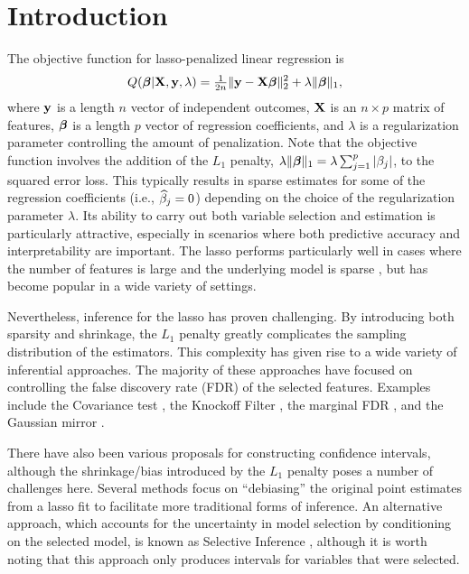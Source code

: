 \section{Introduction}

The objective function for lasso-penalized linear regression \citep{Tibshirani1996} is
$$Q(\boldsymbol{\beta}|\mathbf{X},\mathbf{y},\lambda) = \tfrac{1}{2n}\lVert\mathbf{y} - \mathbf{X}\boldsymbol{\beta}\rVert_2^2 + \lambda\lVert\boldsymbol{\beta}\rVert_1,$$
where $\mathbf{y}$ is a length $n$ vector of independent outcomes, $\mathbf{X}$ is an $n \times p$ matrix of features, $\boldsymbol{\beta}$ is a length $p$ vector of regression coefficients, and $\lambda$ is a regularization parameter controlling the amount of penalization. Note that the objective function involves the addition of the $L_1$ penalty, $\lambda\lVert\boldsymbol{\beta}\rVert_1 = \lambda \sum_{j = 1}^p |\beta_j|$, to the squared error loss. This typically results in sparse estimates for some of the regression coefficients (i.e., $\widehat{\beta}_j = 0$) depending on the choice of the regularization parameter $\lambda$. Its ability to carry out both variable selection and estimation is particularly attractive, especially in scenarios where both predictive accuracy and interpretability are important. The lasso performs particularly well in cases where the number of features is large and the underlying model is sparse \citep{HTF2009}, but has become popular in a wide variety of settings.

Nevertheless, inference for the lasso has proven challenging. By introducing both sparsity and shrinkage, the $L_1$ penalty greatly complicates the sampling distribution of the estimators. This complexity has given rise to a wide variety of inferential approaches. The majority of these approaches have focused on controlling the false discovery rate (FDR) of the selected features. Examples include the Covariance test \citep{Lockhart2014}, the Knockoff Filter \citep{Candes2015,Candes2018}, the marginal FDR \citep{Breheny2019}, and the Gaussian mirror \citep{Xing2023}.

There have also been various proposals for constructing confidence intervals, although the shrinkage/bias introduced by the $L_1$ penalty poses a number of challenges here. Several methods \citep{ZhangZhang2014, Javanmard2014} focus on ``debiasing'' the original point estimates from a lasso fit to facilitate more traditional forms of inference. An alternative approach, which accounts for the uncertainty in model selection by conditioning on the selected model, is known as Selective Inference \citep{Lee2016}, although it is worth noting that this approach only produces intervals for variables that were selected.

